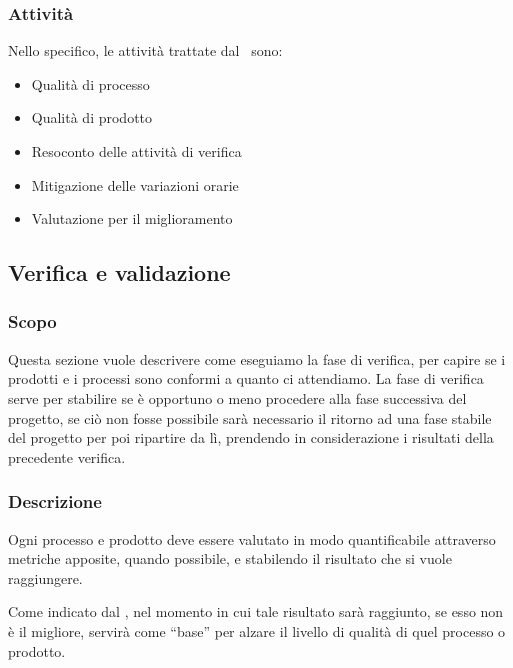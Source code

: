 		

		\subsubsection{Attività}	\label{AttivitaPDQ}
		Nello specifico, le attività trattate dal \PdQd\ sono:
		\begin{itemize}
			\item Qualità di processo
			\item Qualità di prodotto
			\item Resoconto delle attività di verifica
			\item Mitigazione delle variazioni orarie
			\item Valutazione per il miglioramento
		\end{itemize}



	\subsection{Verifica e validazione}\label{Verifica}

		\subsubsection{Scopo}
		Questa sezione vuole descrivere come eseguiamo la fase di verifica, per capire se i prodotti e i processi sono conformi a quanto ci attendiamo.
		La fase di verifica serve per stabilire se è opportuno o meno procedere alla fase successiva del progetto, se ciò non fosse possibile sarà necessario il
		ritorno ad una fase stabile del progetto per poi ripartire da lì, prendendo in considerazione i risultati della precedente verifica.


		\subsubsection{Descrizione}
		Ogni processo e prodotto deve essere valutato in modo quantificabile attraverso metriche apposite, quando possibile, e stabilendo il risultato che si vuole
		raggiungere.

		Come indicato dal , nel momento in cui tale risultato sarà raggiunto, se esso non è il migliore,
		servirà come ``base'' per alzare il livello di qualità di quel processo o prodotto.

